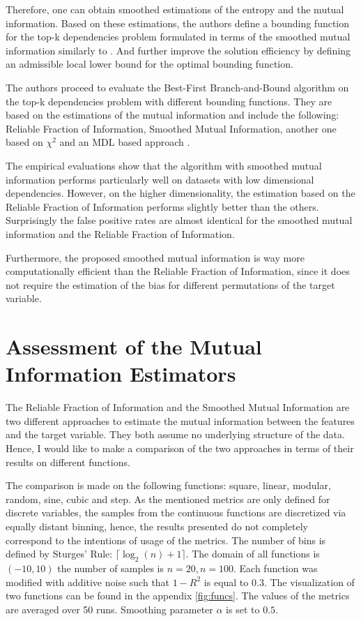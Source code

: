 \documentclass{article}
\begin{document}
Therefore, one can obtain smoothed estimations of the entropy and the mutual information. Based on these estimations, the authors define a bounding function for the top-k dependencies problem formulated in terms of the smoothed mutual information similarly to \cite{mandros2017}. And further improve the solution efficiency by defining an admissible local lower bound for the optimal bounding function. 

The authors proceed to evaluate the Best-First Branch-and-Bound algorithm on the top-k dependencies problem with different bounding functions. They are based on the estimations of the mutual information and include the following: Reliable Fraction of Information, Smoothed Mutual Information, another one based on $\chi^2$\citep{chimi} and an MDL based approach \citep{mdlmi}. 

The empirical evaluations show that the algorithm with smoothed mutual information performs particularly well on datasets with low dimensional dependencies. However, on the higher dimensionality, the estimation based on the Reliable Fraction of Information performs slightly better than the others. Surprisingly the false positive rates are almost identical for the smoothed mutual information and the Reliable Fraction of Information. 

Furthermore, the proposed smoothed mutual information is way more computationally efficient than the Reliable Fraction of Information, since it does not require the estimation of the bias for different permutations of the target variable.

\section{Assessment of the Mutual Information Estimators}
The Reliable Fraction of Information and the Smoothed Mutual Information are two different approaches to estimate the mutual information between the features and the target variable. They both assume no underlying structure of the data. Hence, I would like to make a comparison of the two approaches in terms of their results on different functions. 

The comparison is made on the following functions: square, linear, modular, random, sine, cubic and step. As the mentioned metrics are only defined for discrete variables, the samples from the continuous functions are discretized via equally distant binning, hence, the results presented do not completely correspond to the intentions of usage of the metrics. The number of bins is defined by Sturges' Rule: $\lceil \log_2(n) + 1 \rceil$. The domain of all functions is $(-10, 10)$ the number of samples is $n=20, n=100$. Each function was modified with additive noise such that $1-R^2$ is equal to $0.3$. The visualization of two functions can be found in the appendix \autoref{fig:funcs}. The values of the metrics are averaged over 50 runs. Smoothing parameter $\alpha$ is set to $0.5$. 
\end{document}
